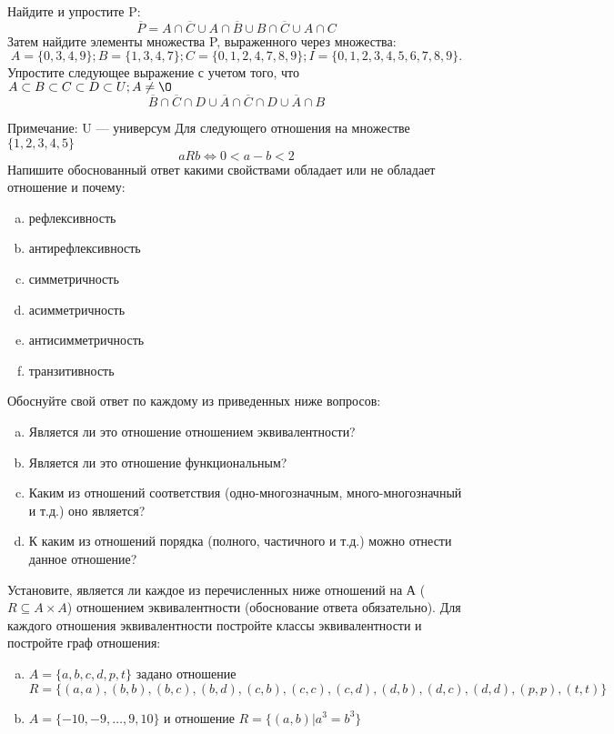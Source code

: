 \documentclass[10pt]{exam}
\begin{document}
\begin{questions}
\question
Найдите и упростите P:
\begin{equation*}
\overline{P} = A \cap \overline{C} \cup A \cap \overline{B} \cup B \cap \overline{C} \cup A \cap C
\end{equation*}
Затем найдите элементы множества P, выраженного через множества:
\begin{equation*}
A = \{0, 3, 4, 9\}; 
B = \{1, 3, 4, 7\};
C = \{0, 1, 2, 4, 7, 8, 9\};
I = \{0, 1, 2, 3, 4, 5, 6, 7, 8, 9\}.
\end{equation*}\question
Упростите следующее выражение с учетом того, что $A\subset B \subset C \subset D \subset U; A \neq \O$
\begin{equation*}
\overline{B} \cap \overline{C} \cap D \cup \overline{A} \cap \overline{C} \cap D \cup \overline{A} \cap B
\end{equation*}

Примечание: U — универсум\question
Для следующего отношения на множестве $\{1, 2, 3, 4, 5\}$ 
\begin{equation*}
aRb \iff 0 < a-b<2
\end{equation*}
Напишите обоснованный ответ какими свойствами обладает или не обладает отношение и почему:   
\begin{enumerate} [a)]\setcounter{enumi}{0}
\item рефлексивность
\item антирефлексивность
\item симметричность
\item асимметричность
\item антисимметричность
\item транзитивность
\end{enumerate}

Обоснуйте свой ответ по каждому из приведенных ниже вопросов:
\begin{enumerate} [a)]\setcounter{enumi}{0}
    \item Является ли это отношение отношением эквивалентности?
    \item Является ли это отношение функциональным?
    \item Каким из отношений соответствия (одно-многозначным, много-многозначный и т.д.) оно является?
    \item К каким из отношений порядка (полного, частичного и т.д.) можно отнести данное отношение?
\end{enumerate}
\question
Установите, является ли каждое из перечисленных ниже отношений на А ($R \subseteq A \times A$) отношением эквивалентности (обоснование ответа обязательно). Для каждого отношения эквивалентности постройте классы 
эквивалентности и постройте граф отношения:
\begin{enumerate} [a)]\setcounter{enumi}{0}
\item $A = \{a, b, c, d, p, t\}$ задано отношение $R = \{(a, a), (b, b), (b, c), (b, d), (c, b), (c, c), (c, d), (d, b), (d, c), (d, d), (p,p), (t,t)\}$
\item $A = \{-10, -9, … , 9, 10\}$ и отношение $R = \{(a,b)|a^{3} = b^{3}\}$


\end{enumerate}
\end{questions}
\end{document}
